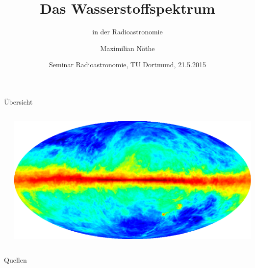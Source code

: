 \documentclass[compress, aspectratio=169]{beamer}
\author{Maximilian Nöthe}
\date[21.5.2015]{Seminar Radioastronomie, TU Dortmund, 21.5.2015}
\title{Das Wasserstoffspektrum}
\subtitle{in der Radioastronomie}
\begin{document}
\maketitle

\begin{frame}{Übersicht}
  \begin{columns}[c, onlytextwidth]
    \begin{column}{0.27\textwidth}
      \linespread{1.5}
      \tableofcontents
    \end{column}
    \begin{column}{0.7\textwidth}
      \includegraphics[width=\linewidth]{./images/lrg_lab_fullvel.png}
    \end{column}
  \end{columns}
\end{frame}







\begin{frame}[allowframebreaks]{Quellen}
\printbibliography{}
\end{frame}
\end{document}
